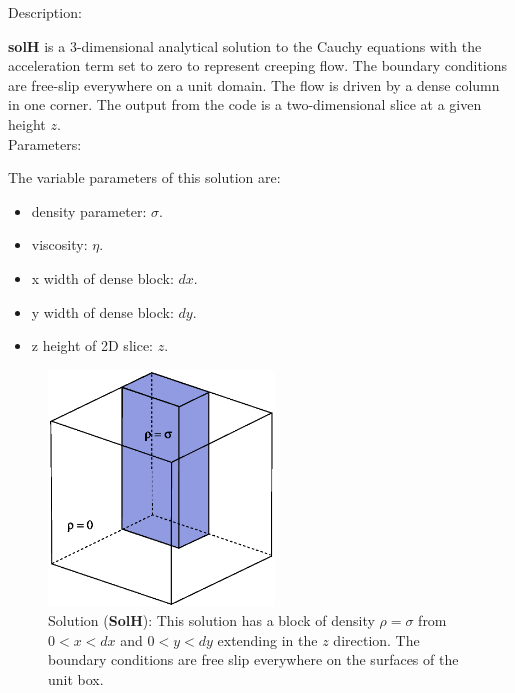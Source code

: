   {\large \fontB Description:}
  
  {\bf solH} is a 3-dimensional analytical solution to the Cauchy equations with the acceleration term set to zero
  to represent creeping flow. The boundary conditions are free-slip everywhere on a unit domain. 
  The flow is driven by a dense column in one corner. The output from the code is a two-dimensional slice
  at a given height $z$.
  \\

  {\large \fontB Parameters:}
 
  The variable parameters of this solution are:
  \begin{itemize}
    \item{density parameter: $ \sigma $.}
    \item{viscosity: $\eta$.}
    \item{x width of dense block: $dx$.}
    \item{y width of dense block: $dy$.}
    \item{z height of 2D slice: $z$.}
    \end{itemize}

  \begin{figure}
    \includegraphics[width=6cm,clip]{../figs/figH.eps}
    \caption[Short caption]{\label{figH} 
      Solution ({\bf SolH}):
      This solution has a block of density $\rho = \sigma$
       from $ 0 < x < dx $ and $ 0 < y < dy $ extending in the $z$ direction.
      The boundary conditions are free slip everywhere on the surfaces of the unit box.}
  \end{figure} 
  

